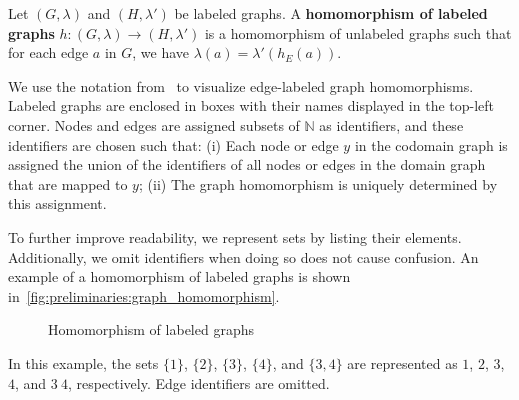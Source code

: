 \begin{definition}
    \label{def:graph:homomorphism}
    Let \( (G,\lambda) \) and \( (H,\lambda') \) be labeled graphs. A \textbf{homomorphism of labeled graphs} $h:(G,\lambda) \rightarrow (H,\lambda')$ is a homomorphism of unlabeled graphs such that for each edge \( a \) in \( G \), we have \( \lambda (a) = \lambda' (h_E (a)) \).
\end{definition}


\begin{notation}
    \label{notation:graph_homomorphism}
    We use the notation from~\cite[Notation 1]{overbeek2023apbpotutorial} to visualize edge-labeled graph homomorphisms. Labeled graphs are enclosed in boxes with their names displayed in the top-left corner. Nodes and edges are assigned subsets of \(\mathbb{N}\) as identifiers, and these identifiers are chosen such that: (i) Each node or edge \( y \) in the codomain graph is assigned the union of the identifiers of all nodes or edges in the domain graph that are mapped to \( y \); (ii) The graph homomorphism is uniquely determined by this assignment.
    
    \noindent To further improve readability, we represent sets by listing their elements. Additionally, we omit identifiers when doing so does not cause confusion. An example of a homomorphism of labeled graphs is shown in~\autoref{fig:preliminaries:graph_homomorphism}.
    
    \begin{figure}[hbtp]
        \centering
    \caption{Homomorphism of labeled graphs}
    \label{fig:preliminaries:graph_homomorphism}
    \end{figure}
    In this example, the sets \(\{1\}\), \(\{2\}\), \(\{3\}\), \(\{4\}\), and \(\{3,4\}\) are represented as \(1\), \(2\), \(3\), \(4\), and \(3\ 4\), respectively. Edge identifiers are omitted.
\end{notation} 


